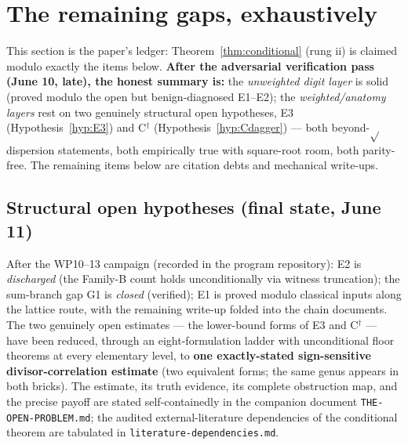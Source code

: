 \section{The remaining gaps, exhaustively}\label{sec:remaining}

This section is the paper's ledger: Theorem~\ref{thm:conditional}
(rung ii) is claimed modulo exactly the items below. \textbf{After the
adversarial verification pass (June 10, late), the honest summary is:}
the \emph{unweighted digit layer} is solid (proved modulo the open but
benign-diagnosed E1--E2); the \emph{weighted/anatomy layers} rest on
two genuinely structural open hypotheses, E3
(Hypothesis~\ref{hyp:E3}) and C$^\dagger$
(Hypothesis~\ref{hyp:Cdagger}) --- both beyond-$\sqrt{}$ dispersion
statements, both empirically true with square-root room, both
parity-free. The remaining items below are citation debts and
mechanical write-ups.

\subsection*{Structural open hypotheses (final state, June 11)}
After the WP10--13 campaign (recorded in the program repository):
E2 is \emph{discharged} (the Family-B count holds unconditionally via
witness truncation); the sum-branch gap G1 is \emph{closed} (verified);
E1 is proved modulo classical inputs along the lattice route, with the
remaining write-up folded into the chain documents. The two genuinely
open estimates --- the lower-bound forms of E3 and C$^\dagger$ --- have
been reduced, through an eight-formulation ladder with unconditional
floor theorems at every elementary level, to \textbf{one exactly-stated
sign-sensitive divisor-correlation estimate} (two equivalent forms; the
same genus appears in both bricks). The estimate, its truth evidence,
its complete obstruction map, and the precise payoff are stated
self-containedly in the companion document
\texttt{THE-OPEN-PROBLEM.md}; the audited external-literature
dependencies of the conditional theorem are tabulated in
\texttt{literature-dependencies.md}.

